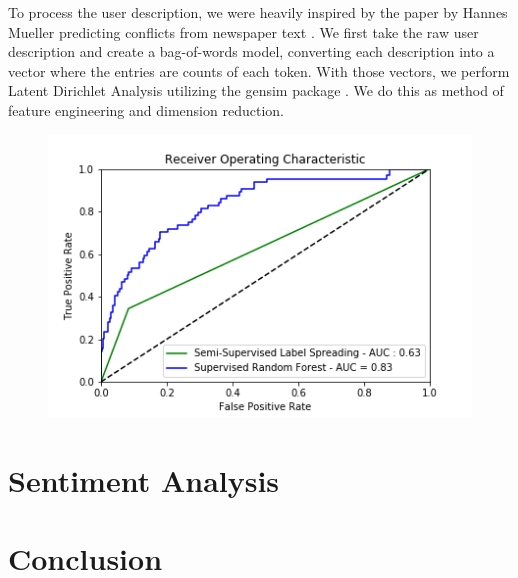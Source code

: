 \documentclass[10pt,a4paper]{article} %
\begin{document}
		To process the user description, we were heavily inspired by the paper by Hannes Mueller predicting conflicts from newspaper text \cite{mueller_rauh_2018}.  We first take the raw user description and create a bag-of-words model, converting each description into a vector where the entries are counts of each token.  With those vectors, we perform Latent Dirichlet Analysis utilizing the gensim package \cite{rehurek_lrec}.  We do this as method of feature engineering and dimension reduction.
		
		\begin{figure}[h]
			\includegraphics[width=0.9\linewidth]{roc_curve}
			\centering
		\end{figure}
	\section{Sentiment Analysis}
	
	\section{Conclusion}
	
	\nocite{*}
	
	
\end{document}
